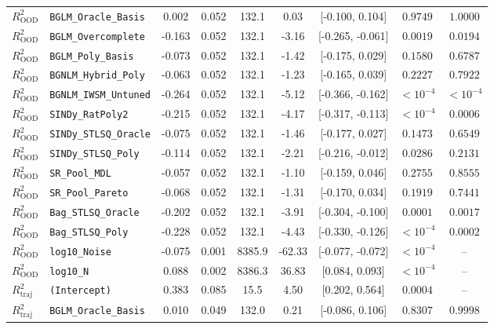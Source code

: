 \begin{table}[t]
\begin{tabular}{llccccccc}
$R^2_{\text{OOD}}$ & \texttt{BGLM\_Oracle\_Basis} & 0.002 & 0.052 & 132.1 & 0.03 & [-0.100, 0.104] & $0.9749$ & $1.0000$ \\
$R^2_{\text{OOD}}$ & \texttt{BGLM\_Overcomplete} & -0.163 & 0.052 & 132.1 & -3.16 & [-0.265, -0.061] & $0.0019$ & $0.0194$ \\
$R^2_{\text{OOD}}$ & \texttt{BGLM\_Poly\_Basis} & -0.073 & 0.052 & 132.1 & -1.42 & [-0.175, 0.029] & $0.1580$ & $0.6787$ \\
$R^2_{\text{OOD}}$ & \texttt{BGNLM\_Hybrid\_Poly} & -0.063 & 0.052 & 132.1 & -1.23 & [-0.165, 0.039] & $0.2227$ & $0.7922$ \\
$R^2_{\text{OOD}}$ & \texttt{BGNLM\_IWSM\_Untuned} & -0.264 & 0.052 & 132.1 & -5.12 & [-0.366, -0.162] & $< 10^{-4}$ & $< 10^{-4}$ \\
$R^2_{\text{OOD}}$ & \texttt{SINDy\_RatPoly2} & -0.215 & 0.052 & 132.1 & -4.17 & [-0.317, -0.113] & $< 10^{-4}$ & $0.0006$ \\
$R^2_{\text{OOD}}$ & \texttt{SINDy\_STLSQ\_Oracle} & -0.075 & 0.052 & 132.1 & -1.46 & [-0.177, 0.027] & $0.1473$ & $0.6549$ \\
$R^2_{\text{OOD}}$ & \texttt{SINDy\_STLSQ\_Poly} & -0.114 & 0.052 & 132.1 & -2.21 & [-0.216, -0.012] & $0.0286$ & $0.2131$ \\
$R^2_{\text{OOD}}$ & \texttt{SR\_Pool\_MDL} & -0.057 & 0.052 & 132.1 & -1.10 & [-0.159, 0.046] & $0.2755$ & $0.8555$ \\
$R^2_{\text{OOD}}$ & \texttt{SR\_Pool\_Pareto} & -0.068 & 0.052 & 132.1 & -1.31 & [-0.170, 0.034] & $0.1919$ & $0.7441$ \\
$R^2_{\text{OOD}}$ & \texttt{Bag\_STLSQ\_Oracle} & -0.202 & 0.052 & 132.1 & -3.91 & [-0.304, -0.100] & $0.0001$ & $0.0017$ \\
$R^2_{\text{OOD}}$ & \texttt{Bag\_STLSQ\_Poly} & -0.228 & 0.052 & 132.1 & -4.43 & [-0.330, -0.126] & $< 10^{-4}$ & $0.0002$ \\
$R^2_{\text{OOD}}$ & \texttt{log10\_Noise} & -0.075 & 0.001 & 8385.9 & -62.33 & [-0.077, -0.072] & $< 10^{-4}$ & -- \\
$R^2_{\text{OOD}}$ & \texttt{log10\_N} & 0.088 & 0.002 & 8386.3 & 36.83 & [0.084, 0.093] & $< 10^{-4}$ & -- \\
\midrule
$R^2_{\text{traj}}$ & \texttt{(Intercept)} & 0.383 & 0.085 & 15.5 & 4.50 & [0.202, 0.564] & $0.0004$ & -- \\
$R^2_{\text{traj}}$ & \texttt{BGLM\_Oracle\_Basis} & 0.010 & 0.049 & 132.0 & 0.21 & [-0.086, 0.106] & $0.8307$ & $0.9998$ \\

\end{tabular}
\end{table}
